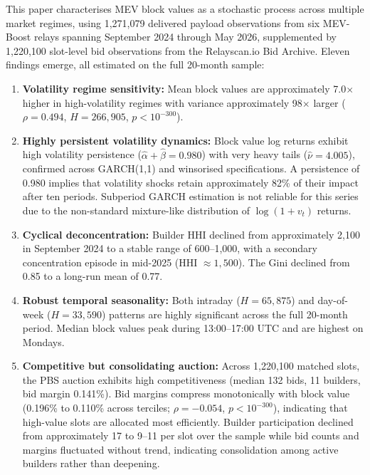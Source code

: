 \documentclass[11pt]{article}
\begin{document}
This paper characterises MEV block values as a stochastic process across
multiple market regimes, using 1,271,079 delivered payload observations from six
MEV-Boost relays spanning September 2024 through May 2026, supplemented by
1,220,100 slot-level bid observations from the Relayscan.io Bid Archive. Eleven
findings emerge, all estimated on the full 20-month sample:

\begin{enumerate}
\item \textbf{Volatility regime sensitivity:} Mean block values are
approximately 7.0$\times$ higher in high-volatility regimes with variance
approximately 98$\times$ larger ($\rho = 0.494$, $H = 266{,}905$,
$p < 10^{-300}$).

\item \textbf{Highly persistent volatility dynamics:} Block value log returns
exhibit high volatility persistence ($\hat\alpha + \hat\beta = 0.980$) with
very heavy tails ($\hat\nu = 4.005$), confirmed across GARCH(1,1) and
winsorised specifications. A persistence of 0.980 implies that volatility
shocks retain approximately 82\% of their impact after ten periods.
Subperiod GARCH estimation is not reliable for this series due to the
non-standard mixture-like distribution of $\log(1+v_t)$ returns.

\item \textbf{Cyclical deconcentration:} Builder HHI declined from
approximately 2,100 in September 2024 to a stable range of 600--1,000, with a
secondary concentration episode in mid-2025 (HHI $\approx 1{,}500$). The Gini
declined from 0.85 to a long-run mean of 0.77.

\item \textbf{Robust temporal seasonality:} Both intraday ($H = 65{,}875$) and
day-of-week ($H = 33{,}590$) patterns are highly significant across the full
20-month period. Median block values peak during 13:00--17:00 UTC and are
highest on Mondays.

\item \textbf{Competitive but consolidating auction:} Across 1,220,100 matched
slots, the PBS auction exhibits high competitiveness (median 132 bids, 11
builders, bid margin 0.141\%). Bid margins compress monotonically with block
value (0.196\% to 0.110\% across terciles; $\rho = -0.054$, $p < 10^{-300}$),
indicating that high-value slots are allocated most efficiently. Builder
participation declined from approximately 17 to 9--11 per slot over the
sample while bid counts and margins fluctuated without trend, indicating
consolidation among active builders rather than deepening.


\end{enumerate}
\end{document}
